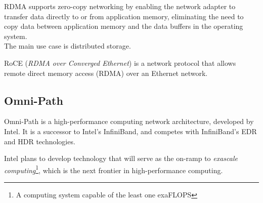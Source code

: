 RDMA supports zero-copy networking by enabling the network adapter to transfer data directly to or from application memory, eliminating the need to copy data between application memory and the data buffers in the operating system.\\
The main use case is distributed storage.

RoCE (\textit{RDMA over Converged Ethernet}) is a network protocol that allows remote direct memory access (RDMA) over an Ethernet network.

\subsection{Omni-Path}
Omni-Path is a high-performance computing network architecture, developed by Intel. It is a successor to Intel's InfiniBand, and competes with InfiniBand's EDR and HDR technologies.

Intel plans to develop technology that will serve as the on-ramp to \textit{exascale computing}\footnote{A computing system capable of the least one exaFLOPS}, which is the next frontier in high-performance computing.

